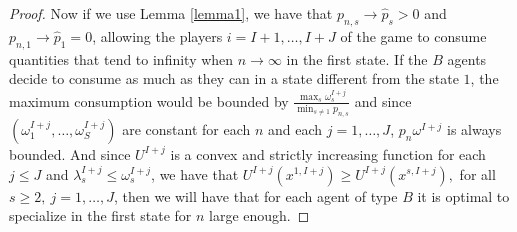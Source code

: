 \documentclass[pdftex]{article}
\numberwithin{equation}{section}
\theoremstyle{th}
\newtheorem{proof lemma}{{Proof Lemma}.}
\theoremstyle{definition}
\newtheorem*{risk lovers}{Risk lovers}
\newtheorem*{risk averse}{Risk averse}
\begin{document}
{\begin{proof}
Now if we use Lemma \ref{lemma1}, we have that $p_{n,s}\rightarrow\hat{p}_s>0$ and $p_{n,1}\rightarrow\hat{p}_1=0$, allowing the players $i=I+1,\dots,I+J$ of the game to consume quantities that tend to infinity when $n\rightarrow\infty$ in the first state. If the $B$ agents decide to consume as much as they can in a state different from the state $1$, the maximum consumption would be bounded by $\frac{\max_s\omega^{I+j}_s}{\min_{s\neq1}p_{n,s}}$ and since $\left(\omega_1^{I+j},\dots,\omega_S^{I+j}\right)$ are constant for each $n$ and each $j=1,\dots,J$, $p_n\omega^{I+j}$ is always bounded. And since $U^{I+j}$ is a convex and strictly increasing function for each $j\leq{J}$ and $\lambda_s^{I+j}\leq\omega_s^{I+j}$, we have that $
U^{I+j}\left(x^{1,I+j}\right)\geq{U}^{I+j}\left(x^{s,I+j}\right),$ for all $s\geq2,\ j=1,\dots,J$, then we will have that for each agent of type $B$ it is optimal to specialize in the first state for $n$ large enough.
\end{proof}


}
\end{document}
